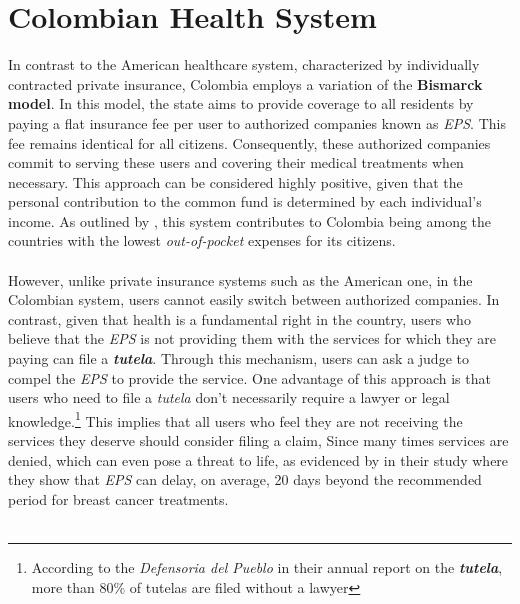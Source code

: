 \documentclass[12pt]{article}
\begin{document}
\section{Colombian Health System}

\begin{flushleft}

    In contrast to the American healthcare system, characterized by individually contracted private insurance, Colombia employs a variation of the \textbf{Bismarck model}. In this model, the state aims to provide coverage to all residents by paying a flat insurance fee per user to authorized companies known as \textit{EPS}. This fee remains identical for all citizens. Consequently, these authorized companies commit to serving these users and covering their medical treatments when necessary. This approach can be considered highly positive, given that the personal contribution to the common fund is determined by each individual's income. As outlined by \citet{perez2015mirada}, this system contributes to Colombia being among the countries with the lowest \textit{out-of-pocket} expenses for its citizens.\\~\\

    However, unlike private insurance systems such as the American one, in the Colombian system, users cannot easily switch between authorized companies. In contrast, given that health is a fundamental right in the country, users who believe that the \textit{EPS} is not providing them with the services for which they are paying can file a \textit{\textbf{tutela}}. Through this mechanism, users can ask a judge to compel the \textit{EPS} to provide the service. One advantage of this approach is that users who need to file a \textit{tutela} don't necessarily require a lawyer or legal knowledge.\footnote{According to the \textit{Defensoria del Pueblo} in their annual report on the \textit{\textbf{tutela}}, more than 80\% of tutelas are filed without a lawyer}  This implies that all users who feel they are not receiving the services they deserve should consider filing a claim, Since many times services are denied, which can even pose a threat to life, as evidenced by \citet{sanchez2014barreras} in their study where they show that \textit{EPS} can delay, on average, 20 days beyond the recommended period for breast cancer treatments.\\~\\
    

\end{flushleft}
\end{document}

